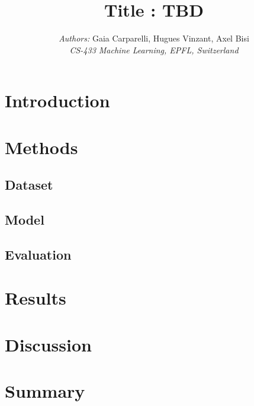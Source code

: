 \documentclass[10pt,conference,compsocconf]{IEEEtran}
\begin{document}
\title{Title : TBD}

\author{
 \textit{Authors:} Gaia Carparelli, Hugues Vinzant, Axel Bisi\\
  \textit{CS-433 Machine Learning, EPFL, Switzerland}
}

\maketitle

\begin{abstract}

\end{abstract}

\section{Introduction}


\section{Methods}
\label{sec:methods}

\subsection{Dataset}


\subsection{Model}


\subsection{Evaluation} %


\section{Results} 
\label{sec:results}



\section{Discussion}
\label{sec:discussion}



\section{Summary}


%
%
\end{document}

